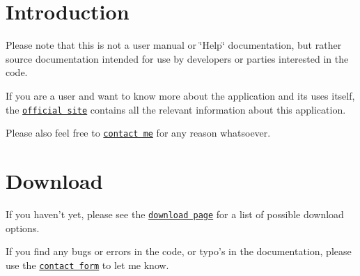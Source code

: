 \hypertarget{index_intro_sec}{}\section{\-Introduction}\label{index_intro_sec}
\-Please note that this is not a user manual or \char`\"{}\-Help\char`\"{} documentation, but rather source documentation intended for use by developers or parties interested in the code.

\-If you are a user and want to know more about the application and its uses itself, the \href{http://goblincoding.com/xmlmill/}{\tt official site} contains all the relevant information about this application.

\-Please also feel free to \href{http://goblincoding.com/contact}{\tt contact me} for any reason whatsoever.\hypertarget{index_download}{}\section{\-Download}\label{index_download}
\-If you haven't yet, please see the \href{http://goblincoding.com/xmlmilldownload}{\tt download page} for a list of possible download options.

\-If you find any bugs or errors in the code, or typo's in the documentation, please use the \href{http://goblincoding.com/contact}{\tt contact form} to let me know. 